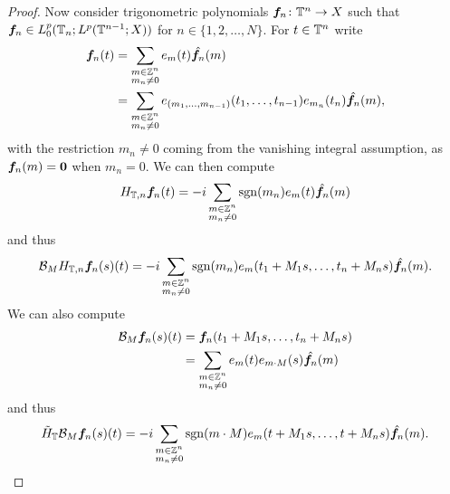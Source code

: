 \begin{proof}
  Now consider trigonometric polynomials $\bm{f}_{n} \colon \mathbb{T}^{n} \to X$ such that $\bm{f}_{n} \in L^{p}_{0}(\mathbb{T}_{n} ; L^p(\mathbb{T}^{n-1};X))$ for $n \in \{1,2,\ldots,N\}$.
  For $t \in \mathbb{T}^{n}$ write
  \begin{equation*}
    \begin{aligned}
      \bm{f}_{n}(t)
      &= \sum_{\substack{m \in \mathbb{Z}^{n} \\ m_{n} \neq 0}} e_{m}(t) \hat{\bm{f}_{n}}(m)  \\
      &= \sum_{\substack{m \in \mathbb{Z}^{n} \\ m_{n} \neq 0}} e_{(m_1,\ldots,m_{n-1})}(t_{1},\ldots,t_{n-1}) e_{m_n}(t_n) \hat{\bm{f}_{n}}(m) ,
  \end{aligned}
  \end{equation*}
  with the restriction $m_{n} \neq 0$ coming from the vanishing integral assumption, as $\bm{f}_{n}(m) = \bm{0}$ when $m_{n} = 0$.
  We can then compute
  \begin{equation*}
    H_{\mathbb{T},n} \bm{f}_{n}(t) = -i \sum_{\substack{m \in \mathbb{Z}^{n} \\ m_{n} \neq 0}} \operatorname{sgn}(m_n) e_{m}(t) \hat{\bm{f}_{n}}(m) 
  \end{equation*}
  and thus
  \begin{equation}\label{eq:BH}
    \mathcal{B}_{M} H_{\mathbb{T},n} \bm{f}_{n}(s)(t) = -i \sum_{\substack{m \in \mathbb{Z}^{n} \\ m_{n} \neq 0}} \operatorname{sgn}(m_n) e_{m}(t_1 + M_1s,\ldots,t_n + M_n s) \hat{\bm{f}_{n}}(m) .
  \end{equation}
  We can also compute
  \begin{equation*}
    \begin{aligned}
      \mathcal{B}_{M} \bm{f}_{n}(s)(t)
      &= \bm{f}_{n}(t_1 + M_1 s, \ldots, t_n + M_n s) \\
      &= \sum_{\substack{m \in \mathbb{Z}^{n} \\ m_n \neq 0}} e_{m}(t) e_{m \cdot M}(s) \hat{\bm{f}_n}(m)
    \end{aligned}
  \end{equation*}
  and thus
  \begin{equation}\label{eq:HB}
    \tilde{H}_{\mathbb{T}} \mathcal{B}_{M} \bm{f}_{n}(s)(t) = -i \sum_{\substack{m \in \mathbb{Z}^{n} \\ m_n \neq 0}} \operatorname{sgn}(m \cdot M) e_{m}(t + M_1 s, \ldots, t + M_n s)  \hat{\bm{f}_n}(m).
  \end{equation}
  

\end{proof}
